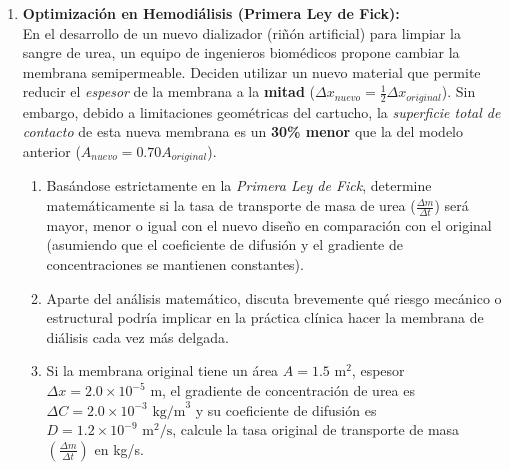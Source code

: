 \documentclass[10pt,letterpaper]{article}
\begin{document}
\begin{enumerate}[leftmargin=*]
    \item \textbf{Optimización en Hemodiálisis (Primera Ley de Fick):}\\
    En el desarrollo de un nuevo dializador (riñón artificial) para limpiar la sangre de urea, un equipo de ingenieros biomédicos propone cambiar la membrana semipermeable. Deciden utilizar un nuevo material que permite reducir el \textit{espesor} de la membrana a la \textbf{mitad} ($\Delta x_{nuevo} = \frac{1}{2} \Delta x_{original}$). Sin embargo, debido a limitaciones geométricas del cartucho, la \textit{superficie total de contacto} de esta nueva membrana es un \textbf{30\% menor} que la del modelo anterior ($A_{nuevo} = 0.70 A_{original}$).
    \begin{enumerate}
        \item Basándose estrictamente en la \textit{Primera Ley de Fick}, determine matemáticamente si la tasa de transporte de masa de urea ($\frac{\Delta m}{\Delta t}$) será mayor, menor o igual con el nuevo diseño en comparación con el original (asumiendo que el coeficiente de difusión y el gradiente de concentraciones se mantienen constantes).
        \item Aparte del análisis matemático, discuta brevemente qué riesgo mecánico o estructural podría implicar en la práctica clínica hacer la membrana de diálisis cada vez más delgada.
        \item Si la membrana original tiene un área $A = 1.5 \text{ m}^2$, espesor $\Delta x = 2.0 \times 10^{-5} \text{ m}$, el gradiente de concentración de urea es $\Delta C = 2.0 \times 10^{-3} \text{ kg/m}^3$ y su coeficiente de difusión es $D = 1.2 \times 10^{-9} \text{ m}^2\text{/s}$, calcule la tasa original de transporte de masa $\left(\frac{\Delta m}{\Delta t}\right)$ en kg/s.
    \end{enumerate}

    \vspace{0.1cm}


\end{enumerate}
\end{document}
